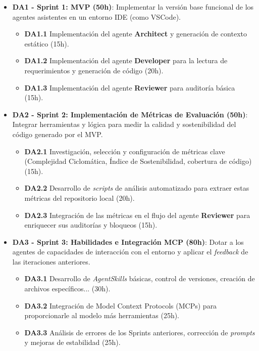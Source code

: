 \documentclass[11pt, letterpaper]{article}
\begin{document}
\begin{itemize}
    \item \textbf{DA1 - Sprint 1: MVP (50h)}: Implementar la versión base funcional de los agentes asistentes en un entorno IDE (como VSCode).
    \begin{itemize}
        \item \textbf{DA1.1} Implementación del agente \textbf{Architect} y generación de contexto estático (15h).
        \item \textbf{DA1.2} Implementación del agente \textbf{Developer} para la lectura de requerimientos y generación de código (20h).
        \item \textbf{DA1.3} Implementación del agente \textbf{Reviewer} para auditoría básica (15h).
    \end{itemize}
    
    \item \textbf{DA2 - Sprint 2: Implementación de Métricas de Evaluación (50h)}: Integrar herramientas y lógica para medir la calidad y sostenibilidad del código generado por el MVP.
    \begin{itemize}
        \item \textbf{DA2.1} Investigación, selección y configuración de métricas clave (Complejidad Ciclomática, Índice de Sostenibilidad, cobertura de código) (15h).
        \item \textbf{DA2.2} Desarrollo de \textit{scripts} de análisis automatizado para extraer estas métricas del repositorio local (20h).
        \item \textbf{DA2.3} Integración de las métricas en el flujo del agente \textbf{Reviewer} para enriquecer sus auditorías y bloqueos (15h).
    \end{itemize}
    
    \item \textbf{DA3 - Sprint 3: Habilidades e Integración MCP (80h)}: Dotar a los agentes de capacidades de interacción con el entorno y aplicar el \textit{feedback} de las iteraciones anteriores.
    \begin{itemize}
        \item \textbf{DA3.1} Desarrollo de \textit{AgentSkills} básicas, control de versiones, creación de archivos específicos... (30h).
        \item \textbf{DA3.2} Integración de Model Context Protocols (MCPs) para proporcionarle al modelo más herramientas (25h).
        \item \textbf{DA3.3} Análisis de errores de los Sprints anteriores, corrección de \textit{prompts} y mejoras de estabilidad (25h).
    \end{itemize}


\end{itemize}
\end{document}
